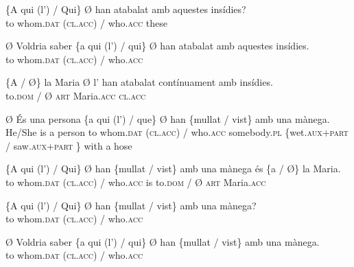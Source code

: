 \documentclass[output=paper,colorlinks,citecolor=brown,nonflat,modfonts]{langsci/langscibook}
\begin{document}
	 
 
 \ex \label{ex:royo:16c}
 \gll \{A qui (l’) / Qui\} Ø han atabalat amb aquestes insídies?\\
to whom.\textsc{dat} (\textsc{cl.acc}) / who.\textsc{acc} these    \\
\glt {}
 
 \ex \label{ex:royo:16d}
 \gll Ø Voldria saber \{a qui (l’) / qui\} Ø han atabalat amb aquestes insídies.\\
 to whom.\textsc{dat} (\textsc{cl.acc}) / who.\textsc{acc}   \\
\glt {}
 
\ex \label{ex:royo:16e}
 \gll \{A / Ø\} la Maria Ø l’ han atabalat contínuament amb insídies.\\
 to.\textsc{dom} / Ø \textsc{art} Maria.\textsc{acc} \textsc{cl.acc} \\
\glt {}
 
 \z
 \z


\ea%
 \label{ex:royo:17}
 \ea \label{ex:royo:17a}
 \gll Ø És una persona \{a qui (l’) / que\} Ø han \{mullat / vist\} amb una mànega.\\
He/She is a person to whom.\textsc{dat} (\textsc{cl.acc}) / who.\textsc{acc} somebody.\textsc{pl} \{wet.\textsc{aux}+\textsc{part} / saw.\textsc{aux}+\textsc{part} \} with a hose \\
\glt {}
 
 \ex \label{ex:royo:17b}
 \gll \{A qui (l’) / Qui\} Ø han \{mullat / vist\} amb una mànega és \{a / Ø\} la Maria.\\
 to whom.\textsc{dat} (\textsc{cl.acc}) / who.\textsc{acc} is to.\textsc{dom} / Ø \textsc{art} Maria.\textsc{acc}\\
\glt {}
 
 \ex \label{ex:royo:17c}
 \gll \{A qui (l’) / Qui\} Ø han \{mullat / vist\} amb una mànega?\\
 to whom.\textsc{dat} (\textsc{cl.acc}) / who.\textsc{acc} \\
\glt {}
 
 \ex \label{ex:royo:17d}
 \gll Ø Voldria saber \{a qui (l’) / qui\} Ø han \{mullat / vist\} amb una mànega.\\
 to whom.\textsc{dat} (\textsc{cl.acc}) / who.\textsc{acc} \\
\glt {}
 
\end{document}
